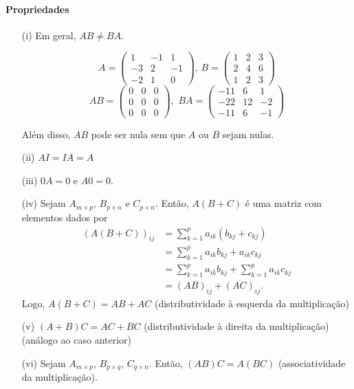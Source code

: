 \paragraph*{Propriedades} 
\begin{itemize}
    \item[(i)] Em geral, $AB\ne BA$.
    \begin{exemplo}
        \begin{equation*}
            A = \begin{pmatrix}
                    1 & -1 & 1\\
                    -3 & 2 & -1\\
                    -2 & 1 & 0
                \end{pmatrix}
            , \, B =
                \begin{pmatrix}
                    1 & 2 & 3\\
                    2 & 4 & 6\\
                    1 & 2 & 3
                \end{pmatrix}
        \end{equation*}
        \begin{equation*}
            AB = \begin{pmatrix}
                    0 & 0 & 0\\
                    0 & 0 & 0\\
                    0 & 0 & 0
                \end{pmatrix}
            , \, \, BA = 
                \begin{pmatrix}
                    -11 & 6 & 1\\
                    -22 & 12 & -2\\
                    -11 & 6 & -1
                \end{pmatrix}
        \end{equation*}
    \end{exemplo}
    Além disso, $AB$ pode ser nula sem que $A$ ou $B$ sejam nulas.

    \item[(ii)] $AI = IA = A$
    \item[(iii)] $0A = 0$ e $A0 = 0$.
    \item[(iv)] Sejam $A_{m\times p}$, $B_{p\times n}$ e $C_{p\times n}$. Então, $A(B+C)$ é uma matriz com elementos dados por
   \begin{align*}
		(A(B+C))_{ij} &= \sum_{k=1}^p a_{ik} (b_{kj}+c_{kj}) \\
		&= \sum_{k=1}^p a_{ik}b_{kj}+a_{ik}c_{kj} \\
		&= \sum_{k=1}^p a_{ik}b_{kj}+\sum_{k=1}^p a_{ik}c_{kj} \\
		&= (AB)_{ij} + (AC)_{ij}.
   \end{align*}
	Logo, $A(B+C) = AB+AC$ (distributividade à esquerda da multiplicação)
    \item[(v)] $(A+B)C = AC+BC$ (distributividade à direita da multiplicação)
(análogo ao caso anterior)
    \item[(vi)] Sejam $A_{m\times p}$, $B_{p\times q}$, $C_{q\times n}$. Então, $(AB)C = A(BC)$ (associatividade da multiplicação).


\end{itemize}
